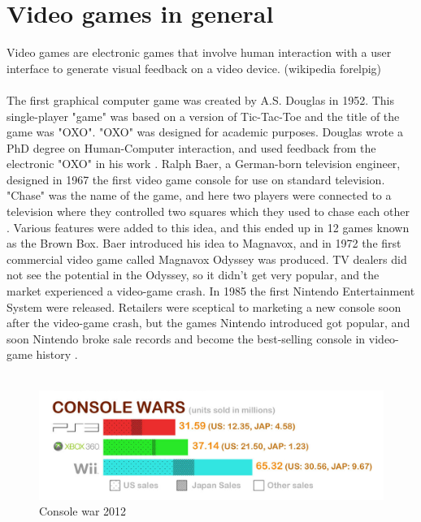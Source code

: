 \section{Video games in general}
Video games are electronic games that involve human interaction with a user interface to generate visual feedback on a video device. (wikipedia forelpig)\\ \\
The first graphical computer game was created by A.S. Douglas in 1952. This single-player "game" was based on a version of Tic-Tac-Toe and the title of the game was "OXO". "OXO" was designed for academic purposes.  Douglas wrote a PhD degree on Human-Computer interaction, and used feedback from the electronic "OXO" in his work \cite{abouthiginbotham}. Ralph Baer, a German-born television engineer, designed in 1967 the first video game console for use on standard television. "Chase" was the name of the game, and here two players were connected to a television where they controlled two squares which they used to chase each other \cite{videogameHistory}. Various features were added to this idea, and this ended up in 12 games known as the Brown Box. Baer introduced his idea to Magnavox, and in 1972 the first commercial video game called Magnavox Odyssey was produced. TV dealers did not see the potential in the Odyssey, so it didn't get very popular, and the market experienced a video-game crash. In 1985 the first Nintendo Entertainment System were released. Retailers were sceptical to marketing a new console soon after the video-game crash, but the games Nintendo introduced got popular, and soon Nintendo broke sale records and become the best-selling console in video-game history \cite{consoleHistory}. \\ \\
\begin{figure}
\label{fig:ConsoleWarsAll}
\begin{center}
\includegraphics[scale=0.5]{consolewarsall}
\caption[Console war]{Console war 2012 \cite{statistics2012}}
\end{center}
\end{figure}
